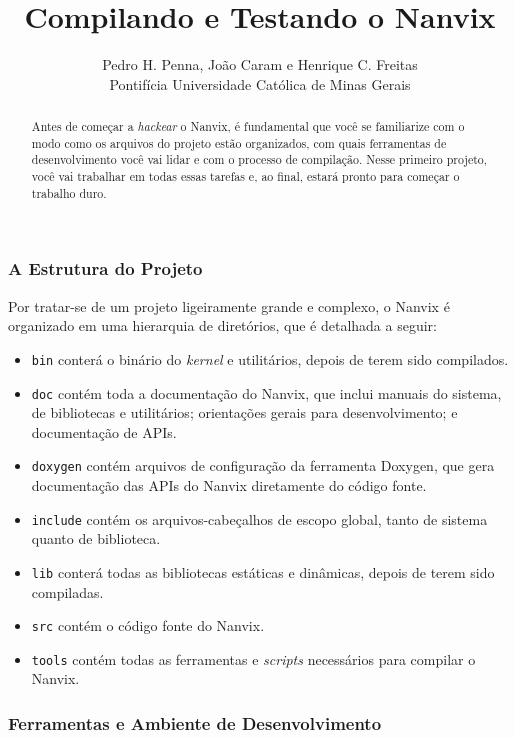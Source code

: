 \documentclass[11pt]{article}
\title{Compilando e Testando o Nanvix}
\author{Pedro H. Penna, João Caram e Henrique C. Freitas\\[0.3em]
\small Pontifícia Universidade Católica de Minas Gerais}
\date{}
\begin{document}
\maketitle

\begin{abstract}
\noindent Antes de começar a \textit{hackear} o Nanvix, é fundamental que você se familiarize com o modo como os arquivos do projeto estão organizados, com quais ferramentas de desenvolvimento você vai lidar e com o processo de compilação. Nesse primeiro projeto, você vai trabalhar em todas essas tarefas e, ao final, estará pronto para começar o trabalho duro.
\end{abstract}

\subsubsection*{A Estrutura do Projeto}

Por tratar-se de um projeto ligeiramente grande e complexo, o Nanvix é organizado em uma hierarquia de diretórios, que é detalhada a seguir:

\begin{itemize}
    \item \texttt{bin} conterá o binário do \textit{kernel} e utilitários, depois de terem sido compilados.
    \item \texttt{doc} contém toda a documentação do Nanvix, que inclui manuais do sistema, de bibliotecas e utilitários; orientações gerais para desenvolvimento; e documentação de APIs.
    \item \texttt{doxygen} contém arquivos de configuração da ferramenta Doxygen, que gera documentação das APIs do Nanvix diretamente do código fonte.
    \item \texttt{include} contém os arquivos-cabeçalhos de escopo global, tanto de sistema quanto de biblioteca.
    \item \texttt{lib} conterá todas as bibliotecas estáticas e dinâmicas, depois de terem sido compiladas.
    \item \texttt{src} contém o código fonte do Nanvix.
    \item \texttt{tools} contém todas as ferramentas e \textit{scripts} necessários para compilar o Nanvix.
\end{itemize}

\newpage

\subsubsection*{Ferramentas e Ambiente de Desenvolvimento}
\end{document}
